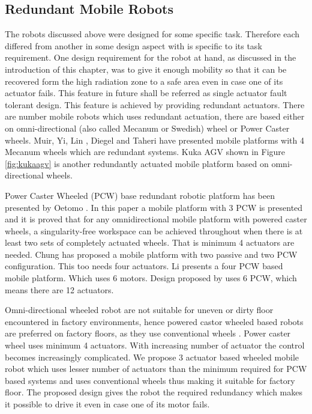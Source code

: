 \subsection{Redundant Mobile Robots}\label{sec:RudantrobotLit}
The robots discussed above were designed for some specific task. Therefore each differed from another in some design aspect with is specific to its task requirement. One  design requirement for the robot at hand, as discussed in the introduction of this chapter, was to give it enough mobility so that it can be recovered form the high radiation zone to a safe area even in case one of its actuator fails. This feature in future shall be referred as single actuator fault tolerant design. This feature is achieved by providing redundant actuators. There are number mobile robots which uses redundant actuation, there are based either on omni-directional (also called Mecanum or Swedish) wheel or Power Caster wheels.  Muir\cite{muir1987kinematic}, Yi\cite{yi2002kinematics}, Lin \cite{lin2013modeling}, Diegel \cite{diegel2002improved} and Taheri \cite{taheri2015kinematic} have presented mobile platforms with 4 Mecanum wheels  which are redundant systems. Kuka AGV shown in Figure \ref{fig:kukaagv} is another redundantly actuated mobile platform based on omni-directional wheels. 

 
 Power Caster Wheeled (PCW) base redundant robotic platform has been presented by Oetomo \cite{oetomo2008singularity}. In this paper a mobile platform with 3 PCW is presented and it is proved that for any omnidirectional  mobile platform with powered caster wheels, a singularity-free  workspace can be achieved throughout when there is at least two  sets of completely actuated wheels. That is minimum 4 actuators are needed. Chung \cite{chung2010design} has proposed  a mobile platform with two passive and two PCW configuration. This too needs four actuators.  Li \cite{li2006wheel} presents a four PCW based mobile platform. Which uses 6 motors. Design proposed by \cite{witus2000mobility, moore2000modelling} uses 6 PCW, which means there are 12 actuators.
 
    Omni-directional wheeled robot are not suitable for uneven or dirty floor encountered in factory environments, hence powered castor wheeled based robots are preferred on factory floors, as they use conventional wheels \cite{park2002optimal}. Power caster wheel uses minimum 4 actuators. With increasing number of actuator the control becomes increasingly complicated. We propose 3 actuator based wheeled mobile robot which uses lesser number of actuators than the minimum required for PCW based systems and uses conventional wheels thus making it suitable for factory floor. The proposed design gives the robot the required redundancy which makes it possible to drive it even in case one of its motor fails.   



